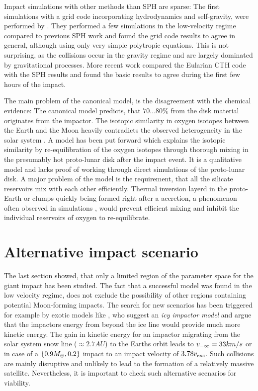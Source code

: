 Impact simulations with other methods than SPH are sparse: The first simulations with a grid code incorporating hydrodynamics and self-gravity, were performed by \cite{Wada:2006p1013}. They performed a few simulations in the low-velocity regime compared to previous SPH work and found the grid code results to agree in general, although using only very simple polytropic equations. This is not surprising, as the collisions occur in the gravity regime and are largely dominated by gravitational processes. More recent work \citep{Canup:2010p3713} compared the Eularian CTH code with the SPH results and found the basic results to agree during the first few hours of the impact.

The main problem of the canonical model, is the disagreement with the chemical evidence: The canonical model predicts, that $70 \dots 80 \%$ from the disk material originates from the impactor. The isotopic similarity in oxygen isotopes between the Earth and the Moon heavily contradicts the observed heterogeneity in the solar system \citep{Wiechert:2001p3543}. A model has been put forward \citep{Pahlevan:2007p2065, 2011E&PSL.301..433P} which explains the isotopic similarity by re-equilibration of the oxygen isotopes through thorough mixing in the presumably hot proto-lunar disk after the impact event. It is a qualitative model and lacks proof of working through direct simulations of the proto-lunar disk. A major problem of the model is the requirement, that all the silicate reservoirs mix with each other efficiently. Thermal inversion layerd in the proto-Earth or clumps quickly being formed right after a accretion, a phenomenon often observed in simulations \citep{1997Icar..126..126C, Cameron:2000p1854, Canup:2001p1861, Canup:2004p115}, would prevent efficient mixing and inhibit the individual reservoirs of oxygen to re-equilibrate.

\section{Alternative impact scenario}
The last section showed, that only a limited region of the parameter space for the giant impact has been studied. The fact that a successful model was found in the low velocity regime, does not exclude the possibility of other regions containing potential Moon-forming impacts. The search for new scenarios has been triggered for example by exotic models like \cite{2010M&PSA..73.5140W}, who suggest an \emph{icy impactor model} and argue that the impactors energy from beyond the ice line would provide much more kinetic energy. The gain in kinetic energy for an impactor migrating from the solar system snow line ($\approx 2.7 AU$) to the Earths orbit leads to $v_{-\infty} = 33 km/s$ or in case of a $\{0.9 M_{\oplus}, 0.2\}$ impact to an impact velocity of $3.78 v_{esc}$. Such collisions are mainly disruptive and unlikely to lead to the formation of a relatively massive satellite. Nevertheless, it is important to check such alternative scenarios for viability.

